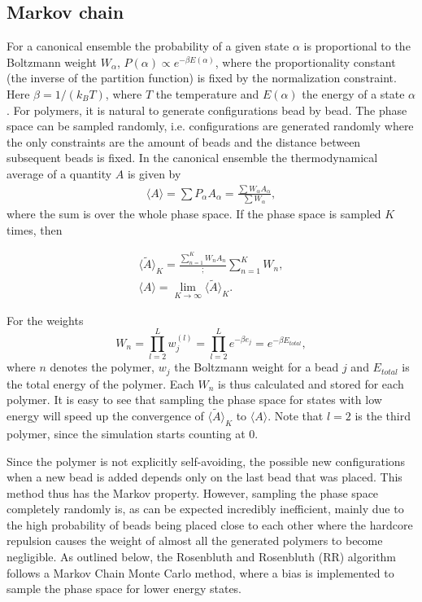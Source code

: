 \subsection{Markov chain}
For a canonical ensemble the probability of a given state $\alpha$ is proportional to the Boltzmann weight $W_\alpha$, $P(\alpha) \propto e^{-\beta E(\alpha)}$, where the proportionality constant (the inverse of the partition function) is fixed by the normalization constraint.  Here $\beta=1/\left(k_B T\right)$, where $T$ the temperature and $E(\alpha)$ the energy of a state $\alpha$. For polymers, it is natural to generate configurations bead by bead. The phase space can be sampled randomly, i.e. configurations are generated randomly where the only constraints are the amount of beads and the distance between subsequent beads is fixed.
In the canonical ensemble the thermodynamical average of a quantity $A$ is given by
\begin{gather}
	\langle A \rangle = \sum P_\alpha A_{\alpha} = \frac{\sum W_\alpha A_{\alpha}}{\sum W_{\alpha}},
\end{gather}
where the sum is over the whole phase space. If the phase space is sampled $K$ times, then

\begin{gather}
	\langle \tilde{A} \rangle_{K} = \frac{\sum_{n=1}^K W_n A_n};{\sum_{n=1}^K W_n},\\
	\langle A \rangle = \lim_{K\rightarrow \infty}\langle \tilde{A} \rangle_{K}.
\end{gather}

For the weights
\begin{equation}
    W_n = \prod_{l=2}^L w_j^{(l)} = \prod_{l=2}^Le^{-\beta e_j} = e^{-\beta E_{total}},
\end{equation} where $n$ denotes the polymer, $w_j$ the Boltzmann weight for a bead $j$ and $E_{total}$ is the total energy of the polymer. Each $W_n$ is thus calculated and stored for each polymer. It is easy to see that sampling the phase space for states with low energy will speed up the convergence of $\langle \tilde{A} \rangle_{K}$ to $	\langle A \rangle$. Note that $l=2$ is the third polymer, since the simulation starts counting at $0$.

Since the polymer is not explicitly self-avoiding, the possible new configurations when a new bead is added depends only on the last bead that was placed. This method thus has the Markov property. However, sampling the phase space completely randomly is, as can be expected incredibly inefficient, mainly due to the high probability of beads being placed close to each other where the hardcore repulsion causes the weight of almost all the generated polymers to become negligible. As outlined below, the Rosenbluth and Rosenbluth (RR) algorithm \cite{rosenbluth1955monte} follows a Markov Chain Monte Carlo method, where a bias is implemented to sample the phase space for lower energy states.




